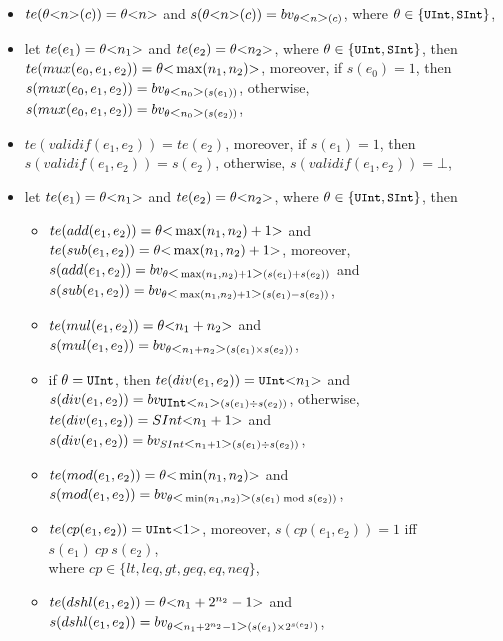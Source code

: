 \begin{itemize}
\item $te(\theta \mbox{<} n \mbox{>}(c)) = \theta \mbox{<} n \mbox{>}$ and $s(\theta \mbox{<} n \mbox{>}(c)) = bv_{\theta \mbox{<} n \mbox{>}(c)}$, where $\theta \in \{\mbox{\prettyll{UInt}}, \mbox{\prettyll{SInt}}\}$,
%
\item let $te(e_1) = \theta \mbox{<} n_1 \mbox{>}$ and $te(e_2) = \theta \mbox{<} n_2 \mbox{>}$, where $\theta \in \{\mbox{\prettyll{UInt}}, \mbox{\prettyll{SInt}}\}$, then $te(mux(e_0, e_1, e_2)) = \theta\mbox{<} \max(n_1, n_2) \mbox{>}$, moreover, if $s(e_0) = 1$, then $s(mux(e_0, e_1, e_2)) = bv_{\theta\mbox{<} n_0 \mbox{>}(s(e_1))}$, otherwise, $s(mux(e_0, e_1, e_2)) = bv_{\theta\mbox{<} n_0 \mbox{>}(s(e_2))}$,
%
\item $te(validif(e_1, e_2)) = te(e_2)$, moreover, if $s(e_1) = 1$, then $s(validif(e_1, e_2)) = s(e_2)$, otherwise, $s(validif(e_1, e_2))  = \bot$,
%
\item let $te(e_1) = \theta \mbox{<} n_1 \mbox{>}$ and $te(e_2) = \theta \mbox{<} n_2 \mbox{>}$, where $\theta \in \{\mbox{\prettyll{UInt}}, \mbox{\prettyll{SInt}}\}$, then
\begin{itemize}
\item $te(add(e_1, e_2)) =\theta \mbox{<} \max(n_1, n_2)+1 \mbox{>}$ and $te(sub(e_1, e_2)) = \theta \mbox{<} \max(n_1, n_2)+1 \mbox{>}$, moreover, $s(add(e_1, e_2)) = bv_{\theta \mbox{<} \max(n_1,n_2)+1 \mbox{>} (s(e_1) + s(e_2))}$ and \\
$s(sub(e_1, e_2)) = bv_{\theta \mbox{<} \max(n_1,n_2)+1 \mbox{>} (s(e_1) - s(e_2))}$,
%
\item $te(mul(e_1, e_2)) = \theta \mbox{<} n_1+n_2 \mbox{>}$ and $s(mul(e_1, e_2)) = bv_{\theta \mbox{<} n_1+n_2 \mbox{>} (s(e_1) \times s(e_2))}$,
%
\item  if $\theta = \mbox{\prettyll{UInt}}$, then $te(div(e_1, e_2)) =\mbox{\prettyll{UInt}} \bwidth{n_1}$ and $s(div(e_1, e_2)) = bv_{\mbox{\prettyll{UInt}} \bwidth{n_1} (s(e_1) \div s(e_2))}$, otherwise, $te(div(e_1, e_2)) = SInt \mbox{<} n_1+1 \mbox{>}$ and $s(div(e_1, e_2)) = bv_{SInt \mbox{<} n_1+1 \mbox{>} (s(e_1) \div s(e_2))}$,
%
\item $te(mod(e_1, e_2)) = \theta \mbox{<} \min(n_1,n_2) \mbox{>}$ and $s(mod(e_1, e_2)) = bv_{\theta \mbox{<} \min(n_1,n_2) \mbox{>} (s(e_1) \bmod s(e_2))}$,
%
\item $te(cp(e_1, e_2)) = \mbox{\prettyll{UInt}} \bwidth{1}$, moreover, $s(cp(e_1, e_2)) = 1$ iff $s(e_1)\ cp\ s(e_2)$, \\ where $cp \in \{lt, leq, gt, geq, eq, neq\}$,
%
\item $te(dshl(e_1, e_2)) = \theta \mbox{<} n_1+2^{n_2}-1 \mbox{>}$ and $s(dshl(e_1, e_2)) = bv_{\theta \mbox{<} n_1+2^{n_2}-1 \mbox{>}(s(e_1) \times 2^{s(e_2)})}$,

\end{itemize}
\end{itemize}
